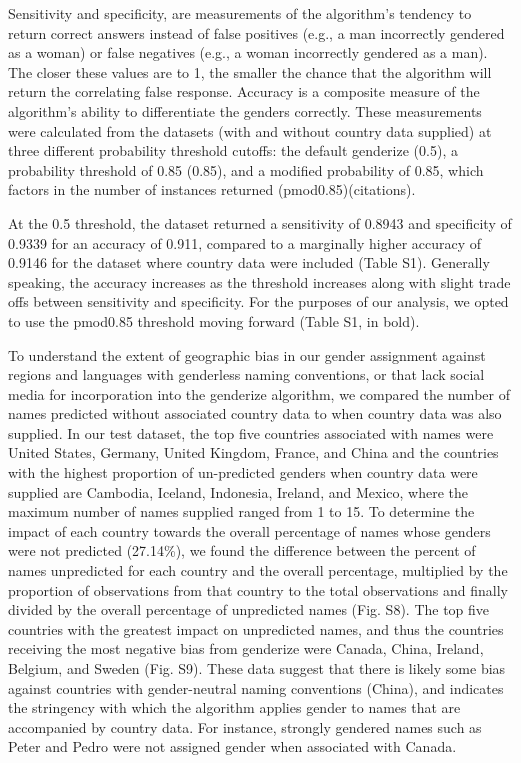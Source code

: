 \documentclass[11pt,]{article}
\begin{document}
Sensitivity and specificity, are measurements of the algorithm's
tendency to return correct answers instead of false positives (e.g., a
man incorrectly gendered as a woman) or false negatives (e.g., a woman
incorrectly gendered as a man). The closer these values are to 1, the
smaller the chance that the algorithm will return the correlating false
response. Accuracy is a composite measure of the algorithm's ability to
differentiate the genders correctly. These measurements were calculated
from the datasets (with and without country data supplied) at three
different probability threshold cutoffs: the default genderize (0.5), a
probability threshold of 0.85 (0.85), and a modified probability of
0.85, which factors in the number of instances returned
(pmod0.85)(citations).

At the 0.5 threshold, the dataset returned a sensitivity of 0.8943 and
specificity of 0.9339 for an accuracy of 0.911, compared to a marginally
higher accuracy of 0.9146 for the dataset where country data were
included (Table S1). Generally speaking, the accuracy increases as the
threshold increases along with slight trade offs between sensitivity and
specificity. For the purposes of our analysis, we opted to use the
pmod0.85 threshold moving forward (Table S1, in bold).

To understand the extent of geographic bias in our gender assignment
against regions and languages with genderless naming conventions, or
that lack social media for incorporation into the genderize algorithm,
we compared the number of names predicted without associated country
data to when country data was also supplied. In our test dataset, the
top five countries associated with names were United States, Germany,
United Kingdom, France, and China and the countries with the highest
proportion of un-predicted genders when country data were supplied are
Cambodia, Iceland, Indonesia, Ireland, and Mexico, where the maximum
number of names supplied ranged from 1 to 15. To determine the impact of
each country towards the overall percentage of names whose genders were
not predicted (27.14\%), we found the difference between the percent of
names unpredicted for each country and the overall percentage,
multiplied by the proportion of observations from that country to the
total observations and finally divided by the overall percentage of
unpredicted names (Fig. S8). The top five countries with the greatest
impact on unpredicted names, and thus the countries receiving the most
negative bias from genderize were Canada, China, Ireland, Belgium, and
Sweden (Fig. S9). These data suggest that there is likely some bias
against countries with gender-neutral naming conventions (China), and
indicates the stringency with which the algorithm applies gender to
names that are accompanied by country data. For instance, strongly
gendered names such as Peter and Pedro were not assigned gender when
associated with Canada.
\end{document}
